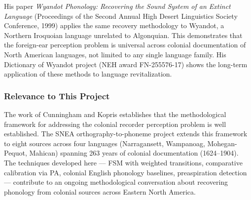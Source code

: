 His paper \emph{Wyandot Phonology: Recovering the Sound System of an Extinct
Language} (Proceedings of the Second Annual High Desert Linguistics Society
Conference, 1999) applies the same recovery methodology to Wyandot, a
Northern Iroquoian language unrelated to Algonquian. This demonstrates that
the foreign-ear perception problem is universal across colonial documentation
of North American languages, not limited to any single language family. His
Dictionary of Wyandot project (NEH award FN-255576-17) shows the long-term
application of these methods to language revitalization.

\subsubsection*{Relevance to This Project}

The work of Cunningham and Kopris establishes that the methodological
framework for addressing the colonial recorder perception problem is well
established. The SNEA orthography-to-phoneme project extends this framework
to eight sources across four languages (Narragansett, Wampanoag, Mohegan-Pequot,
Mahican) spanning 263 years of colonial documentation (1624--1904). The
techniques developed here --- FSM with weighted transitions, comparative
calibration via PA, colonial English phonology baselines, preaspiration
detection --- contribute to an ongoing methodological conversation about
recovering phonology from colonial sources across Eastern North America.
